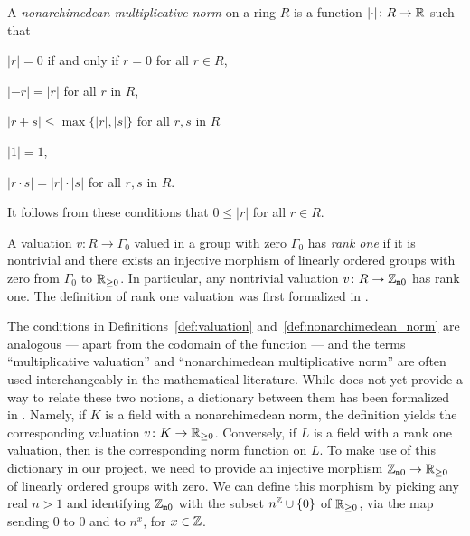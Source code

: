\documentclass[sigplan,10pt,anonymous,review]{acmart}
\begin{document}
\begin{definition}\label{def:nonarchimedean_norm}
A \emph{nonarchimedean multiplicative norm} on a ring $R$ is a function $\lvert\cdot\rvert \colon R \to \mathbb{R}$
such that
\begin{listDef}
\item $\lvert r\rvert = 0$ if and only if $r = 0$ for all $r \in R$, 
\item $\lvert -r\rvert = \lvert r\rvert$ for all $r$ in $R$,
\item $\lvert r + s\rvert \leq \max \{\lvert r\rvert, \lvert s\rvert \}$ for all $r, s$ in $R$
\item $\lvert 1\rvert = 1$,
\item $\lvert r\cdot s\rvert  = \lvert r\rvert \cdot \lvert s\rvert $ for all $r, s$ in $R$.
\end{listDef}
It follows from these conditions that $0 \le \lvert r\rvert$ for all $r \in R$.
\end{definition}
A valuation $v \colon R \to \Gamma_0$ valued in a group with zero $\Gamma_0$ has \emph{rank one} if it is nontrivial and there exists an injective morphism of linearly ordered groups with zero from $\Gamma_0$ to $\mathbb{R}_{\ge 0}$. In particular, any nontrivial valuation $v \colon R \to \mathbb{Z}_{\mathtt{m}0}$ has rank one. The definition of rank one valuation was first formalized in \cite{deF23}\href{https://github.com/mariainesdff/norm_extensions_journal_submission/blob/d396130660935464fbc683f9aaf37fff8a890baa/src/rank_one_valuation.lean#L38}{\extlink}.

The conditions in Definitions~\ref{def:valuation} and~\ref{def:nonarchimedean_norm} are analogous --- apart from the codomain of the function --- and the terms ``multiplicative valuation'' and ``nonarchimedean multiplicative norm'' are often used interchangeably in the mathematical literature. While \mathlib does not yet provide a way to relate these two notions, a dictionary between them has been formalized in \cite{deF23}. Namely, if $K$ is a field with a nonarchimedean norm, the definition \href{https://github.com/mariainesdff/norm_extensions_journal_submission/blob/d396130660935464fbc683f9aaf37fff8a890baa/src/normed_valued.lean#L37}{\extlink} yields the corresponding valuation $v \colon K \rightarrow \mathbb{R}_{\ge 0}$. Conversely, if $L$ is a field with a rank one valuation, then \href{https://github.com/mariainesdff/norm_extensions_journal_submission/blob/d396130660935464fbc683f9aaf37fff8a890baa/src/normed_valued.lean#L110}{\extlink} is the corresponding norm function on $L$.
To  make use of this dictionary in our project, we need to provide an injective morphism $\mathbb{Z}_{\mathtt{m}0} \to \mathbb{R}_{\ge 0}$ of linearly ordered groups with zero. We can define this morphism by picking any real $n > 1$ and identifying $\mathbb{Z}_{\mathtt{m}0}$ with the subset $n^{\mathbb{Z}} \cup \{0\}$ of $\mathbb{R}_{\ge 0}$, via the map sending $0$ to $0$ and  to $n^x$, for $x \in \mathbb{Z}$.
\end{document}
